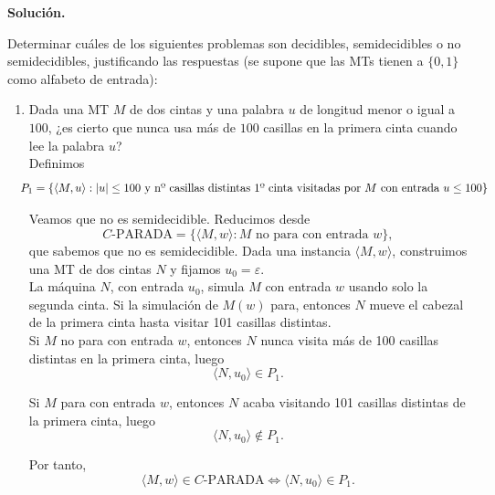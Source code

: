 \documentclass[12pt]{article}
\begin{document}
    \newpage
    \setcounter{ejercicio}{0} %
    \noindent
    \textbf{Solución.}

    \begin{ejercicio}[2.4 puntos]
        Determinar cuáles de los siguientes problemas son decidibles, semidecidibles o no semidecidibles, justificando las respuestas (se supone que las MTs tienen a $\{0,1\}$ como alfabeto de entrada):

        \begin{enumerate}
            \item Dada una MT $M$ de dos cintas y una palabra $u$ de longitud menor o igual a $100$, ¿es cierto que nunca usa más de $100$ casillas 
            en la primera cinta cuando lee la palabra $u$? \\

            Definimos
            $$
            \hspace{-0.3cm} P_1=\{\langle M,u\rangle : |u|\leq 100 \text{ y nº casillas distintas 1º cinta visitadas por } M \text{ con entrada } u \leq 100\}  
            $$

            Veamos que no es semidecidible. Reducimos desde
            $$
            C\text{-PARADA}=\{\langle M,w\rangle : M \text{ no para con entrada } w\},
            $$
            que sabemos que no es semidecidible. Dada una instancia $\langle M,w\rangle$,
            construimos una MT de dos cintas $N$ y fijamos $u_0=\varepsilon$. \\

            La máquina $N$, con entrada $u_0$, simula $M$ con entrada $w$ usando solo la
            segunda cinta. Si la simulación de $M(w)$ para, entonces $N$ mueve el cabezal de
            la primera cinta hasta visitar 101 casillas distintas. \\

            Si $M$ no para con entrada $w$, entonces $N$ nunca visita más de 100 casillas
            distintas en la primera cinta, luego
            $$
            \langle N,u_0\rangle\in P_1.
            $$

            Si $M$ para con entrada $w$, entonces $N$ acaba visitando 101 casillas distintas
            de la primera cinta, luego
            $$
            \langle N,u_0\rangle\notin P_1.
            $$

            Por tanto,
            $$
            \langle M,w\rangle\in C\text{-PARADA}
            \Longleftrightarrow
            \langle N,u_0\rangle\in P_1.
            $$


\end{enumerate}
\end{ejercicio}
\end{document}
